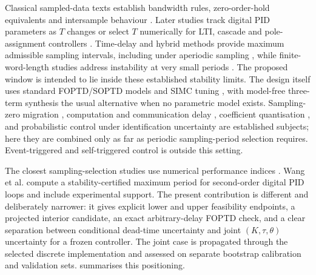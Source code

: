 \documentclass[a4paper,fleqn]{cas-sc}
\theoremstyle{remark}
\begin{document}
Classical sampled-data texts establish bandwidth rules, zero-order-hold equivalents and intersample behaviour \citep{astrom1997computer,franklin1998digital,isermann1989digital,middleton1990digital,goodwin2001control,chen1995optimal,feuer1996sampling,laila2002dissipation,monaco2007advanced,hagiwara2008modified}. Later studies track digital PID parameters as $T$ changes or select $T$ numerically for LTI, cascade and pole-assignment controllers \citep{laskawski2015sampling,susca2023sampling,araujo2024samplingperiod}. Time-delay and hybrid methods provide maximum admissible sampling intervals, including under aperiodic sampling \citep{fridman2010refined,hetel2017recent,fagundes2024stability}, while finite-word-length studies address instability at very small periods \citep{fialho1994wordlength,gessing2001fwl}. The proposed window is intended to lie inside these established stability limits. The design itself uses standard FOPTD/SOPTD models and SIMC tuning \citep{seborg2010process,skogestad2003simc,rivera1986internal,astrom2006advanced,garpinger2014performance}, with model-free three-term synthesis \citep{keel2008robust} the usual alternative when no parametric model exists. Sampling-zero migration \citep{astrom1984zeros,yuz2005sampled}, computation and communication delay \citep{wittenmark1995timing,nilsson1998stochastic,cervin2003timing,seto1996task}, coefficient quantisation \citep{middleton1986delta}, and probabilistic control under identification uncertainty \citep{campi2008exact,calafiore2011probabilistic,tempo2013randomized,ljung1999system} are established subjects; here they are combined only as far as periodic sampling-period selection requires. Event-triggered and self-triggered control \citep{astrom2002comparison,tabuada2007event,heemels2012introduction} is outside this setting.

The closest sampling-selection studies use numerical performance indices \citep{susca2023sampling,araujo2024samplingperiod}. Wang et al. \citep{wang2025impulsive} compute a stability-certified maximum period for second-order digital PID loops and include experimental support. The present contribution is different and deliberately narrower: it gives explicit lower and upper feasibility endpoints, a projected interior candidate, an exact arbitrary-delay FOPTD check, and a clear separation between conditional dead-time uncertainty and joint $(K,\tau,\theta)$ uncertainty for a frozen controller. The joint case is propagated through the selected discrete implementation and assessed on separate bootstrap calibration and validation sets.  summarises this positioning.
\end{document}
